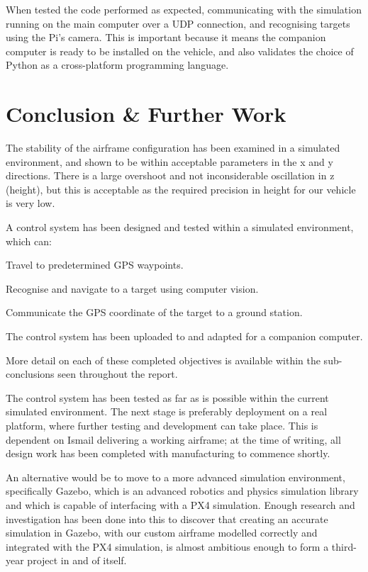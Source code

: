 \documentclass[11pt]{article}
\begin{document}
When tested the code performed as expected, communicating with the simulation running on the main computer over a UDP connection, and recognising targets using the Pi's camera. This is important because it means the companion computer is ready to be installed on the vehicle, and also validates the choice of Python as a cross-platform programming language.

\section{Conclusion \& Further Work}
\begin{compactenum}
    \item The stability of the airframe configuration has been examined in a simulated environment, and shown to be within acceptable parameters in the x and y directions. There is a large overshoot and not inconsiderable oscillation in z (height), but this is acceptable as the required precision in height for our vehicle is very low.
    \item A control system has been designed and tested within a simulated environment, which can:
    \begin{compactenum}
        \item Travel to predetermined GPS waypoints.
        \item Recognise and navigate to a target using computer vision.
        \item Communicate the GPS coordinate of the target to a ground station.
    \end{compactenum}
    \item The control system has been uploaded to and adapted for a companion computer.
\end{compactenum}
\vspace{1em}

More detail on each of these completed objectives is available within the sub-conclusions seen throughout the report.

The control system has been tested as far as is possible within the current simulated environment. The next stage is preferably deployment on a real platform, where further testing and development can take place. This is dependent on Ismail delivering a working airframe; at the time of writing, all design work has been completed with manufacturing to commence shortly\cite{Ismail_paper}.

An alternative would be to move to a more advanced simulation environment, specifically Gazebo, which is an advanced robotics and physics simulation library and which is capable of interfacing with a PX4 simulation\cite{PX4_dev_guide}. Enough research and investigation has been done into this to discover that creating an accurate simulation in Gazebo, with our custom airframe modelled correctly and integrated with the PX4 simulation, is almost ambitious enough to form a third-year project in and of itself.
\end{document}
